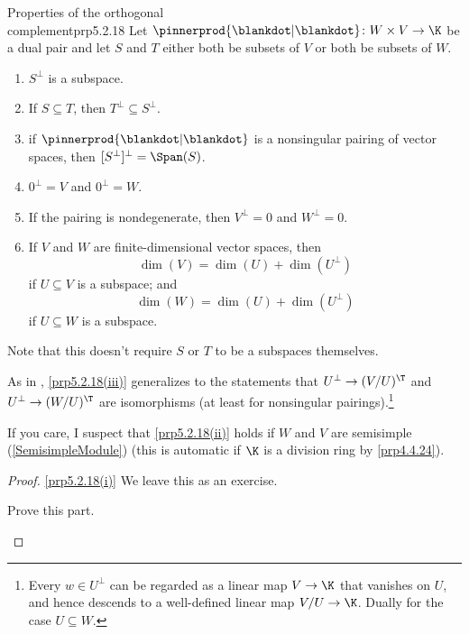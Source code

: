 \begin{prp}{Properties of the orthogonal \\ complement}{prp5.2.18}
	Let $\pinnerprod{\blankdot |\blankdot}\colon W\times V\rightarrow \K$ be a dual pair and let $S$ and $T$ either both be subsets of $V$ or both be subsets of $W$.
	\begin{enumerate}
		\item \label{prp5.2.18(i)}$S^{\perp}$ is a subspace.
		\item \label{prp5.2.18(iix)}If $S\subseteq T$, then $T^{\perp}\subseteq S^{\perp}$.
		\item \label{prp5.2.18(ii)}if $\pinnerprod{\blankdot |\blankdot}$ is a nonsingular pairing of vector spaces, then $[S^{\perp}]^{\perp}=\Span (S)$.
		\item \label{prp5.2.18(iiix)}$0^{\perp}=V$ and $0^{\perp}=W$.
		\item \label{prp5.2.18(iiixx)}If the pairing is nondegenerate, then $V^{\perp}=0$ and $W^{\perp}=0$.
		\item \label{prp5.2.18(iii)}If $V$ and $W$ are finite-dimensional vector spaces, then
		\begin{equation}
			\dim (V)=\dim (U)+\dim (U^{\perp})
		\end{equation}
		if $U\subseteq V$ is a subspace; and
		\begin{equation}
			\dim (W)=\dim (U)+\dim (U^{\perp})
		\end{equation}
		if $U\subseteq W$ is a subspace.
	\end{enumerate}
	\begin{rmk}
		Note that this doesn't require $S$ or $T$ to be a subspaces themselves.
	\end{rmk}
	\begin{rmk}
		As in , \cref{prp5.2.18(iii)} generalizes to the statements that $U^{\perp}\rightarrow (V/U)^{\T}$ and $U^{\perp}\rightarrow (W/U)^{\T}$ are isomorphisms (at least for nonsingular pairings).\footnote{Every $w\in U^{\perp}$ can be regarded as a linear map $V\rightarrow \K$ that vanishes on $U$, and hence descends to a well-defined linear map $V/U\rightarrow \K$.  Dually for the case $U\subseteq W$.}
	\end{rmk}
	\begin{rmk}
		If you care, I suspect that \cref{prp5.2.18(ii)} holds if $W$ and $V$ are semisimple (\cref{SemisimpleModule}) (this is automatic if $\K$ is a division ring by \cref{prp4.4.24}).
	\end{rmk}
	\begin{proof}
		\cref{prp5.2.18(i)} We leave this as an exercise.
		\begin{exr}[breakable=false]{}{}
			Prove this part.
		\end{exr}
		

\end{proof}
\end{prp}
